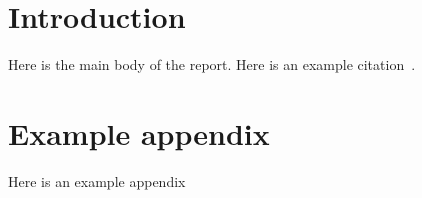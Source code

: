 \documentclass[10pt,a4paper]{article}
\title{\titulo}
\date{\data}
\author{\name\\ \institution\\ {\small (Based on notes produced by João Leitão)}}
\begin{document}

\maketitle

\begin{abstract}
Here is the report abstract
\end{abstract}

\section{Introduction}
\label{sec:intro}
Here is the main body of the report. Here is an example citation~\cite{gossip}.




\appendix
\section{Example appendix}
Here is an example appendix
\end{document}
